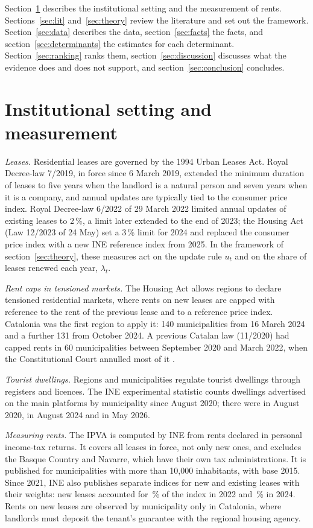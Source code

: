 \documentclass[11pt,a4paper]{article}
\begin{document}
Section~\ref{sec:institutions} describes the institutional setting and the measurement of rents. Sections~\ref{sec:lit} and~\ref{sec:theory} review the literature and set out the framework. Section~\ref{sec:data} describes the data, section~\ref{sec:facts} the facts, and section~\ref{sec:determinants} the estimates for each determinant. Section~\ref{sec:ranking} ranks them, section~\ref{sec:discussion} discusses what the evidence does and does not support, and section~\ref{sec:conclusion} concludes.

\section{Institutional setting and measurement}\label{sec:institutions}

\textit{Leases.} Residential leases are governed by the 1994 Urban Leases Act. Royal Decree-law 7/2019, in force since 6 March 2019, extended the minimum duration of leases to five years when the landlord is a natural person and seven years when it is a company, and annual updates are typically tied to the consumer price index. Royal Decree-law 6/2022 of 29 March 2022 limited annual updates of existing leases to 2\,\%, a limit later extended to the end of 2023; the Housing Act (Law 12/2023 of 24 May) set a 3\,\% limit for 2024 and replaced the consumer price index with a new INE reference index from 2025. In the framework of section~\ref{sec:theory}, these measures act on the update rule $u_t$ and on the share of leases renewed each year, $\lambda_t$.

\textit{Rent caps in tensioned markets.} The Housing Act allows regions to declare tensioned residential markets, where rents on new leases are capped with reference to the rent of the previous lease and to a reference price index. Catalonia was the first region to apply it: 140 municipalities from 16 March 2024 and a further 131 from October 2024. A previous Catalan law (11/2020) had capped rents in 60 municipalities between September 2020 and March 2022, when the Constitutional Court annulled most of it \citep{jofre2023}.

\textit{Tourist dwellings.} Regions and municipalities regulate tourist dwellings through registers and licences. The INE experimental statistic counts dwellings advertised on the main platforms by municipality since August 2020; there were \vutTwenty{} in August 2020, \vutTwentyFour{} in August 2024 and \vutTwentySix{} in May 2026.

\textit{Measuring rents.} The IPVA is computed by INE from rents declared in personal income-tax returns. It covers all leases in force, not only new ones, and excludes the Basque Country and Navarre, which have their own tax administrations. It is published for municipalities with more than 10,000 inhabitants, with base 2015. Since 2021, INE also publishes separate indices for new and existing leases with their weights: new leases accounted for \wNewtwotwo\,\% of the index in 2022 and \wNewtwofour\,\% in 2024. Rents on new leases are observed by municipality only in Catalonia, where landlords must deposit the tenant's guarantee with the regional housing agency.
\end{document}

